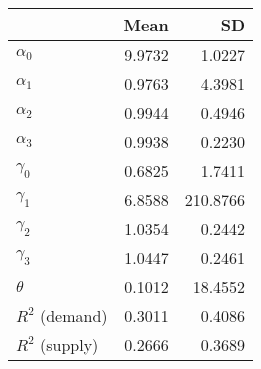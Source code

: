 
\begin{tabular}[t]{lrr}
\toprule
  & Mean & SD\\
\midrule
$\alpha_{0}$ & 9.9732 & 1.0227\\
$\alpha_{1}$ & 0.9763 & 4.3981\\
$\alpha_{2}$ & 0.9944 & 0.4946\\
$\alpha_{3}$ & 0.9938 & 0.2230\\
$\gamma_{0}$ & 0.6825 & 1.7411\\
$\gamma_{1}$ & 6.8588 & 210.8766\\
$\gamma_{2}$ & 1.0354 & 0.2442\\
$\gamma_{3}$ & 1.0447 & 0.2461\\
$\theta$ & 0.1012 & 18.4552\\
$R^{2}$ (demand) & 0.3011 & 0.4086\\
$R^{2}$ (supply) & 0.2666 & 0.3689\\
\bottomrule
\end{tabular}
